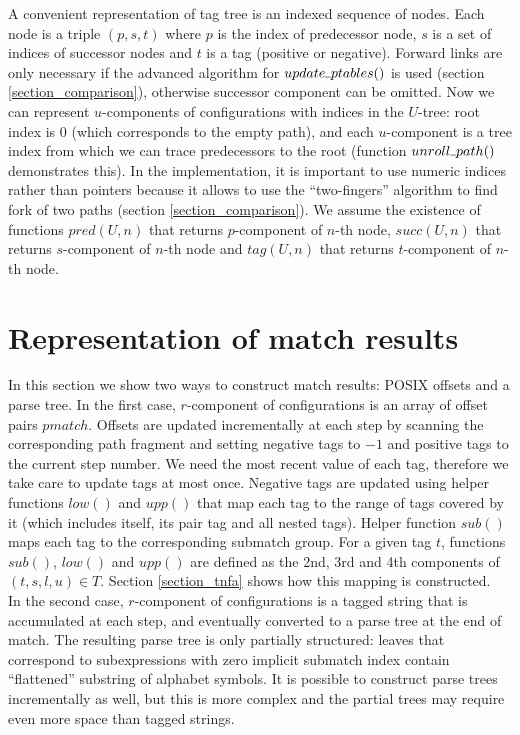 \documentclass[AMA,STIX1COL]{WileyNJD-v2}
\newcommand{\Xund}{\rule{.4em}{.4pt}}
\begin{document}
A convenient representation of tag tree is an indexed sequence of nodes.
Each node is a triple $(p, s, t)$ where
$p$ is the index of predecessor node,
$s$ is a set of indices of successor nodes
and $t$ is a tag (positive or negative).
%
Forward links are only necessary if the advanced algorithm for $update \Xund ptables ()$ is used
(section \ref{section_comparison}), otherwise successor component can be omitted.
%
Now we can represent $u$-components of configurations with indices in the $U$-tree:
root index is $0$ (which corresponds to the empty path),
and each $u$-component is a tree index from which we can trace predecessors to the root
(function $unroll \Xund path ()$ demonstrates this).
%
In the implementation, it is important to use numeric indices rather than pointers
because it allows to use the ``two-fingers'' algorithm to find fork of two paths (section \ref{section_comparison}).
%
We assume the existence of functions
$pred(U, n)$ that returns $p$-component of $n$-th node,
$succ(U, n)$ that returns $s$-component of $n$-th node and
$tag(U, n)$ that returns $t$-component of $n$-th node.


\section{Representation of match results}\label{section_results}

In this section we show two ways to construct match results: POSIX offsets and a parse tree.
%
In the first case, $r$-component of configurations is an array of offset pairs $pmatch$.
Offsets are updated incrementally at each step by scanning the corresponding path fragment
and setting negative tags to $-1$ and positive tags to the current step number.
We need the most recent value of each tag, therefore we take care to update tags at most once.
Negative tags are updated using helper functions $low()$ and $upp()$ that map each tag to the range of tags covered by it
(which includes itself, its pair tag and all nested tags).
Helper function $sub()$ maps each tag to the corresponding submatch group.
For a given tag $t$, functions $sub()$, $low()$ and $upp()$ are defined as the 2nd, 3rd and 4th components of $(t, s, l, u) \in T$.
Section \ref{section_tnfa} shows how this mapping is constructed.
\\

In the second case, $r$-component of configurations is a tagged string that is accumulated at each step,
and eventually converted to a parse tree at the end of match.
The resulting parse tree is only partially structured:
leaves that correspond to subexpressions with zero implicit submatch index contain ``flattened'' substring of alphabet symbols.
It is possible to construct parse trees incrementally as well,
but this is more complex and the partial trees may require even more space than tagged strings.
\\
\end{document}
